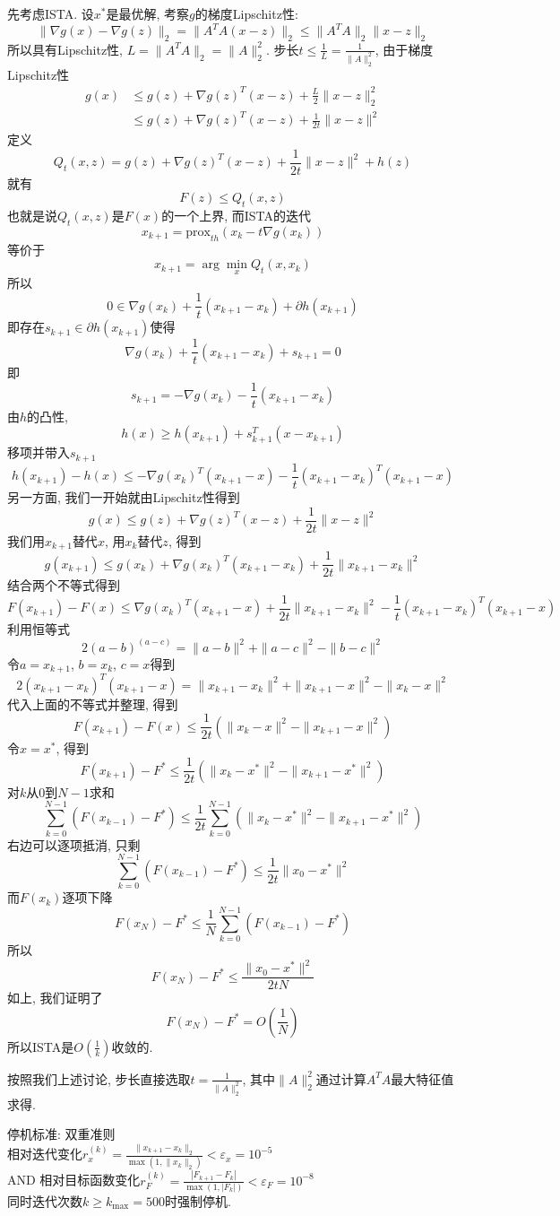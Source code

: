\documentclass[UTF8]{ctexart}
\theoremstyle{definition}
\theoremstyle{examplestyle}
\theoremstyle{remark}
\begin{document}
先考虑ISTA. 设$x^*$是最优解, 考察$g$的梯度Lipschitz性:
\[\|\nabla g(x)-\nabla g(z)\|_2=\|A^TA(x-z)\|_2\le\|A^TA\|_2\|x-z\|_2\]
所以具有Lipschitz性, $L=\|A^TA\|_2=\|A\|_2^2$. 步长$t\le\frac{1}{L}=\frac{1}{\|A\|_2^2}$, 由于梯度Lipschitz性
\[\begin{aligned}g(x)&\le g(z)+\nabla g(z)^T(x-z)+\frac{L}{2}\|x-z\|_2^2\\&\le g(z)+\nabla g(z)^T(x-z)+\frac{1}{2t}\|x-z\|^2\end{aligned}\]
定义
\[Q_t(x,z)=g(z)+\nabla g(z)^T(x-z)+\frac{1}{2t}\|x-z\|^2+h(z)\]
就有
\[F(z)\le Q_t(x,z)\]
也就是说$Q_t(x,z)$是$F(x)$的一个上界, 而ISTA的迭代
\[x_{k+1}=\text{prox}_{th}(x_k-t\nabla g(x_k))\]
等价于
\[x_{k+1}=\arg\min_xQ_t(x,x_k)\]
所以
\[0\in\nabla g(x_k)+\frac{1}{t}(x_{k+1}-x_k)+\partial h(x_{k+1})\]
即存在$s_{k+1}\in\partial h(x_{k+1})$使得
\[\nabla g(x_k)+\frac{1}{t}(x_{k+1}-x_k)+s_{k+1}=0\]
即
\[s_{k+1}=-\nabla g(x_k)-\frac{1}{t}(x_{k+1}-x_k)\]
由$h$的凸性,
\[h(x)\ge h(x_{k+1})+s_{k+1}^T(x-x_{k+1})\]
移项并带入$s_{k+1}$
\[h(x_{k+1})-h(x)\le-\nabla g(x_k)^T(x_{k+1}-x)-\frac{1}{t}(x_{k+1}-x_k)^T(x_{k+1}-x)\]
另一方面, 我们一开始就由Lipschitz性得到
\[g(x)\le g(z)+\nabla g(z)^T(x-z)+\frac{1}{2t}\|x-z\|^2\]
我们用$x_{k+1}$替代$x$, 用$x_k$替代$z$, 得到
\[g(x_{k+1})\le g(x_k)+\nabla g(x_k)^T(x_{k+1}-x_k)+\frac{1}{2t}\|x_{k+1}-x_k\|^2\]
结合两个不等式得到
\[F(x_{k+1})-F(x)\le\nabla g(x_k)^T(x_{k+1}-x)+\frac{1}{2t}\|x_{k+1}-x_k\|^2-\frac{1}{t}(x_{k+1}-x_k)^T(x_{k+1}-x)\]
利用恒等式
\[2(a-b)^(a-c)=\|a-b\|^2+\|a-c\|^2-\|b-c\|^2\]
令$a=x_{k+1}$, $b=x_k$, $c=x$得到
\[2(x_{k+1}-x_k)^T(x_{k+1}-x)=\|x_{k+1}-x_k\|^2+\|x_{k+1}-x\|^2-\|x_k-x\|^2\]
代入上面的不等式并整理, 得到
\[F(x_{k+1})-F(x)\le\frac{1}{2t}(\|x_k-x\|^2-\|x_{k+1}-x\|^2)\]
令$x=x^*$, 得到
\[F(x_{k+1})-F^*\le\frac{1}{2t}(\|x_k-x^*\|^2-\|x_{k+1}-x^*\|^2)\]
对$k$从$0$到$N-1$求和
\[\sum_{k=0}^{N-1}(F(x_{k-1})-F^*)\le\frac{1}{2t}\sum_{k=0}^{N-1}(\|x_k-x^*\|^2-\|x_{k+1}-x^*\|^2)\]
右边可以逐项抵消, 只剩
\[\sum_{k=0}^{N-1}(F(x_{k-1})-F^*)\le\frac{1}{2t}\|x_0-x^*\|^2\]
而$F(x_k)$逐项下降
\[F(x_N)-F^*\le\frac{1}{N}\sum_{k=0}^{N-1}(F(x_{k-1})-F^*)\]
所以
\[F(x_N)-F^*\le\frac{\|x_0-x^*\|^2}{2tN}\]
如上, 我们证明了
\[F(x_N)-F^*=O(\frac{1}{N})\]
所以ISTA是$O(\frac{1}{k})$收敛的.


按照我们上述讨论, 步长直接选取$t=\frac{1}{\|A\|_2^2}$, 其中$\|A\|_2^2$通过计算$A^TA$最大特征值求得.

停机标准: 双重准则\\
相对迭代变化$r_x^{(k)}=\frac{\|x_{k+1}-x_k\|_2}{\max(1,\|x_k\|_2)}<\varepsilon_x=10^{-5}$\\
AND 相对目标函数变化$r_F^{(k)}=\frac{|F_{k+1}-F_k|}{\max(1,|F_k|)}<\varepsilon_F=10^{-8}$\\
同时迭代次数$k\ge k_{\text{max}}=500$时强制停机.
\end{document}
